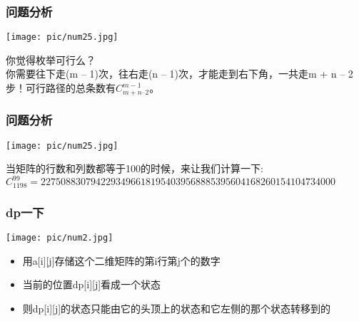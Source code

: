 \documentclass{beamer}
\begin{document}
\begin{frame}[fragile]
\frametitle{问题分析}

\begin{minipage}[b]{0.30\linewidth}
	\texttt{[image: pic/num25.jpg]}
\end{minipage}
\hfill
\begin{minipage}[b]{0.55\linewidth}
	
	
\end{minipage}

你觉得枚举可行么？\\
你需要往下走(m – 1)次，往右走(n – 1)次，才能走到右下角，一共走m + n – 2步！可行路径的总条数有$C_{m + n – 2}^{m - 1}$。
\end{frame}

\begin{frame}[fragile]
\frametitle{问题分析}

\begin{minipage}[b]{0.30\linewidth}
	\texttt{[image: pic/num25.jpg]}
\end{minipage}
\hfill
\begin{minipage}[b]{0.55\linewidth}
	
	
\end{minipage}

当矩阵的行数和列数都等于100的时候，来让我们计算一下:\\
$C_{1198}^{99}=22750883079422934966181954039568885395604168260154104734000$
\end{frame}

\begin{frame}[fragile]
\frametitle{dp一下}

\begin{minipage}[b]{0.30\linewidth}
	\texttt{[image: pic/num2.jpg]}
\end{minipage}
\hfill
\begin{minipage}[b]{0.55\linewidth}
	\begin{itemize}
		\item 用a[i][j]存储这个二维矩阵的第i行第j个的数字
		\item 当前的位置dp[i][j]看成一个状态
		\item 则dp[i][j]的状态只能由它的头顶上的状态和它左侧的那个状态转移到的
	\end{itemize}
	
\end{minipage}
\end{frame}
\end{document}
